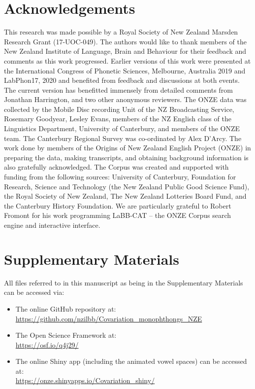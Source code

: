 \documentclass[review]{elsarticle} %
\begin{document}
\vfill
\newpage

\section*{Acknowledgements}
\noindent This research was made possible by a Royal Society of New Zealand Marsden Research Grant (17-UOC-049). The authors would like to thank members of the New Zealand Institute of Language, Brain and Behaviour for their feedback and comments as this work progressed. Earlier versions of this work were presented at the International Congress of Phonetic Sciences, Melbourne, Australia 2019 and LabPhon17, 2020 and benefited from feedback and discussions at both events. The current version has benefitted immensely from detailed comments from Jonathan Harrington, and two other anonymous reviewers.  The ONZE data was collected by the Mobile Disc recording Unit of the NZ Broadcasting Service, Rosemary Goodyear, Lesley Evans, members of the NZ English class of the Linguistics Department, University of Canterbury, and members of the ONZE team. The Canterbury Regional Survey was co-ordinated by Alex D'Arcy. The work done by members of the Origins of New Zealand English Project (ONZE) in preparing the data, making transcripts, and obtaining background information is also gratefully acknowledged. The Corpus was created and supported with funding from the following sources: University of Canterbury, Foundation for Research, Science and Technology (the New Zealand Public Good Science Fund), the Royal Society of New Zealand, The New Zealand Lotteries Board Fund, and the Canterbury History Foundation.    We are particularly grateful to Robert Fromont for his work programming LaBB-CAT – the ONZE Corpus search engine and interactive interface.

\section*{Supplementary Materials}
\label{sec:supplementarymaterials}

\noindent All files referred to in this manuscript as being in the Supplementary Materials can be accessed via:

\begin{itemize}
    \item The online GitHub repository at:\\ \url{https://github.com/nzilbb/Covariation_monophthongs_NZE}
    \item The Open Science Framework at:\\ \url{https://osf.io/q4j29/}
    \item The online Shiny app (including the animated vowel spaces) can be accessed at:\\
    \url{https://onze.shinyapps.io/Covariation_shiny/}
\end{itemize}
\end{document}
